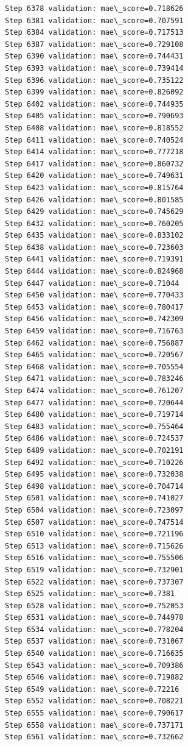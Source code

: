 \documentclass[11pt]{article}
\begin{document}
\begin{Verbatim}[commandchars=\\\{\}]
Step 6378 validation: mae\_score=0.718626
Step 6381 validation: mae\_score=0.707591
Step 6384 validation: mae\_score=0.717513
Step 6387 validation: mae\_score=0.729108
Step 6390 validation: mae\_score=0.744431
Step 6393 validation: mae\_score=0.739414
Step 6396 validation: mae\_score=0.735122
Step 6399 validation: mae\_score=0.826092
Step 6402 validation: mae\_score=0.744935
Step 6405 validation: mae\_score=0.790693
Step 6408 validation: mae\_score=0.818552
Step 6411 validation: mae\_score=0.740524
Step 6414 validation: mae\_score=0.777218
Step 6417 validation: mae\_score=0.860732
Step 6420 validation: mae\_score=0.749631
Step 6423 validation: mae\_score=0.815764
Step 6426 validation: mae\_score=0.801585
Step 6429 validation: mae\_score=0.745629
Step 6432 validation: mae\_score=0.760205
Step 6435 validation: mae\_score=0.833102
Step 6438 validation: mae\_score=0.723603
Step 6441 validation: mae\_score=0.719391
Step 6444 validation: mae\_score=0.824968
Step 6447 validation: mae\_score=0.71044
Step 6450 validation: mae\_score=0.770433
Step 6453 validation: mae\_score=0.780417
Step 6456 validation: mae\_score=0.742309
Step 6459 validation: mae\_score=0.716763
Step 6462 validation: mae\_score=0.756887
Step 6465 validation: mae\_score=0.720567
Step 6468 validation: mae\_score=0.705554
Step 6471 validation: mae\_score=0.783246
Step 6474 validation: mae\_score=0.761207
Step 6477 validation: mae\_score=0.720644
Step 6480 validation: mae\_score=0.719714
Step 6483 validation: mae\_score=0.755464
Step 6486 validation: mae\_score=0.724537
Step 6489 validation: mae\_score=0.702191
Step 6492 validation: mae\_score=0.710226
Step 6495 validation: mae\_score=0.732038
Step 6498 validation: mae\_score=0.704714
Step 6501 validation: mae\_score=0.741027
Step 6504 validation: mae\_score=0.723097
Step 6507 validation: mae\_score=0.747514
Step 6510 validation: mae\_score=0.721196
Step 6513 validation: mae\_score=0.715626
Step 6516 validation: mae\_score=0.755506
Step 6519 validation: mae\_score=0.732901
Step 6522 validation: mae\_score=0.737307
Step 6525 validation: mae\_score=0.7381
Step 6528 validation: mae\_score=0.752053
Step 6531 validation: mae\_score=0.744978
Step 6534 validation: mae\_score=0.778204
Step 6537 validation: mae\_score=0.731067
Step 6540 validation: mae\_score=0.716635
Step 6543 validation: mae\_score=0.709386
Step 6546 validation: mae\_score=0.719882
Step 6549 validation: mae\_score=0.72216
Step 6552 validation: mae\_score=0.708221
Step 6555 validation: mae\_score=0.790617
Step 6558 validation: mae\_score=0.737171
Step 6561 validation: mae\_score=0.732662

\end{Verbatim}
\end{document}
